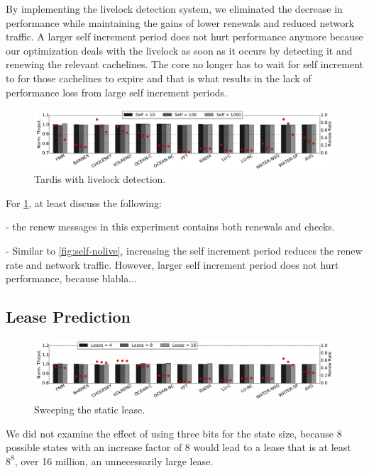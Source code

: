 \documentclass[12pt]{article}
\begin{document}
  
  By implementing the livelock detection system, we eliminated the decrease in performance while maintaining the gains of lower renewals and reduced network traffic.  A larger self increment period does not hurt performance anymore because our optimization deals with the livelock  as soon as it occurs by detecting it and renewing the relevant cachelines. The core no longer has to wait for self increment to for those cachelines to expire and that is what results in the lack of performance loss from large self increment periods.

\begin{figure}
	\centering
	\includegraphics[width=0.95\columnwidth]{figs/selfincr_live.pdf}
	\caption{ Tardis with livelock detection. }
	\label{fig:self-live}
\end{figure}

For \cref{fig:self-live}, at least discuss the following:

- the renew messages in this experiment contains both renewals and 
  checks.

- Similar to \cref{fig:self-nolive}, increasing the self increment 
  period reduces the renew rate and network traffic. However, larger 
  self increment period does not hurt performance, because blabla...

\subsection{Lease Prediction}

\begin{figure}
	\centering
	\includegraphics[width=0.95\columnwidth]{figs/static.pdf}
	\caption{ Sweeping the static lease.  }
	\label{fig:static}
\end{figure}

We did not examine the effect of using three bits for the state size, because 8 possible states with an increase factor of 8 would lead to a lease that is at least $8^8$, over 16 million, an unnecessarily large lease.
\end{document}
